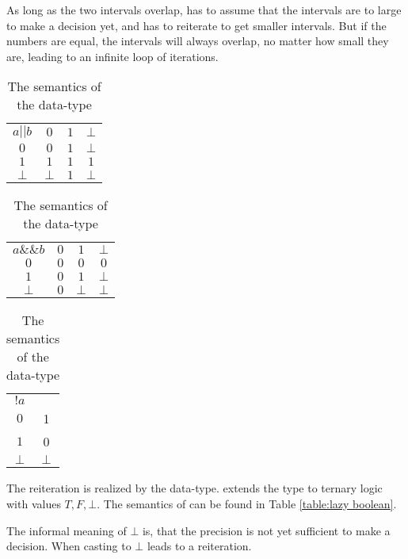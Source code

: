	  As long as the two intervals overlap, \irram has to assume that the
    intervals are to large to make a decision yet, and has to reiterate to
    get smaller intervals.
    But if the numbers are equal, the intervals will always overlap, 
		no matter how small they are, leading to an infinite loop of iterations.
    \begin{table}
       \centering
       \begin{tabular}{|c||c|c|c|}
        \hline
        $ a || b$ & $0$ & $1$ & $\bot$ \\ \hhline{|=||=|=|=|} 
        $ 0 $     & $0$ & $1$ & $\bot$ \\ \hline
        $ 1$      & $1$ & $1$ & $1$ \\ \hline
        $\bot$ & $\bot$  & $1$ & $\bot$ \\ \hline
       \end{tabular}
       \quad
       \begin{tabular}{|c||c|c|c|}
        \hline
        $ a \&\& b$ & $0$ & $1$ & $\bot$ \\ \hhline{|=||=|=|=|} 
        $ 0 $     & $0$ & $0$ & $0$ \\ \hline
        $ 1$      & $0$ & $1$ & $\bot$ \\ \hline
        $\bot$ & $0$  & $\bot$ & $\bot$ \\ \hline
       \end{tabular}
       \quad
       \begin{tabular}{|c||c|}
        \hline
        $ !a $ &   \\ \hhline{|=||=|} 
        $ 0 $ &  1 \\ \hline
        $ 1$ &  0 \\ \hline
        $\bot$ & $\bot$  \\ \hline
       \end{tabular}
    \caption{The semantics of the  data-type}\label{table:lazy
  boolean}
    \end{table}
    The reiteration is realized by the  data-type.
     extends the  type to  ternary logic
		with values $T, F,\bot$. The semantics of  can be found
    in Table \ref{table:lazy boolean}.
    
    The informal meaning of $\bot$ is, that the precision is not yet sufficient
    to make a decision.
		When casting to  $\bot$ leads to a reiteration. 

